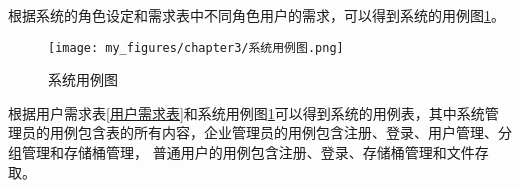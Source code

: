 根据系统的角色设定和需求表中不同角色用户的需求，可以得到系统的用例图\ref{fig:系统用例图}。

\begin{figure}[h]
    \centering
    \texttt{[image: my\_figures/chapter3/系统用例图.png]}
    \caption{系统用例图}
    \label{fig:系统用例图}
\end{figure}



根据用户需求表\ref{用户需求表}和系统用例图\ref{fig:系统用例图}可以得到系统的用例表，其中系统管理员的用例包含表的所有内容，企业管理员的用例包含注册、登录、用户管理、分组管理和存储桶管理，
普通用户的用例包含注册、登录、存储桶管理和文件存取。

